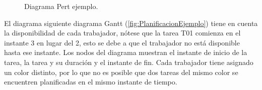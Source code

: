 \begin{figure}[h]
    \begin{center}
    \end{center}
    \caption{Diagrama Pert ejemplo.}
    \label{fig:ExamplePert}
\end{figure}

El diagrama siguiente diagrama Gantt (\ref{fig:PlanificacionEjemplo}) tiene en cuenta la disponibilidad de cada trabajador,
nótese que la tarea T01 comienza en el instante 3 en lugar del 2,
esto se debe a que el trabajador no está disponible hasta ese instante.
Los nodos del diagrama muestran el instante de inicio de la tarea,
la tarea y su duración y el instante de fin.
Cada trabajador tiene asignado un color distinto,
por lo que no es posible que dos tareas del mismo color
se encuentren planificadas en el mismo instante de tiempo.

